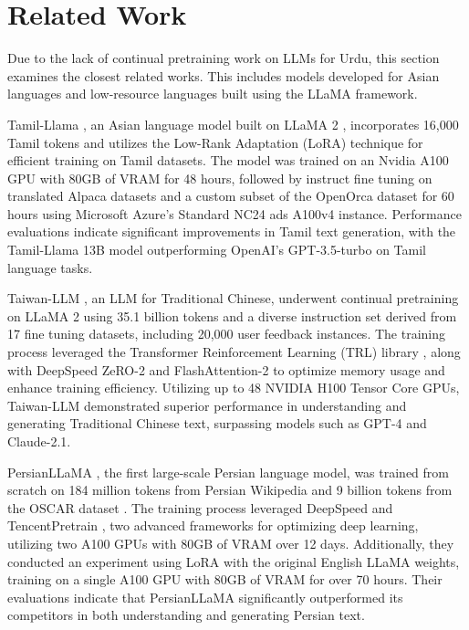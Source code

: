 \section{Related Work}
\label{sec:literature}
Due to the lack of continual pretraining work on LLMs for Urdu, this section examines the closest related works. This includes models developed for Asian languages and low-resource languages built using the LLaMA framework.

Tamil-Llama \citep{tamilllama}, an Asian language model built on LLaMA 2 \citep{llama2}, incorporates 16,000 Tamil tokens and utilizes the Low-Rank Adaptation (LoRA) \citep{lora} technique for efficient training on Tamil datasets. The model was trained on an Nvidia A100 GPU with 80GB of VRAM for 48 hours, followed by instruct fine tuning on translated Alpaca datasets \citep{alpaca} and a custom subset of the OpenOrca \citep{openorca} dataset for 60 hours using Microsoft Azure’s Standard NC24 ads A100v4 instance. Performance evaluations indicate significant improvements in Tamil text generation, with the Tamil-Llama 13B model outperforming OpenAI's GPT-3.5-turbo on Tamil language tasks.

Taiwan-LLM \citep{18}, an LLM for Traditional Chinese, underwent continual pretraining on LLaMA 2 \citep{llama2} using 35.1 billion tokens and a diverse instruction set derived from 17 fine tuning datasets, including 20,000 user feedback instances. The training process leveraged the Transformer Reinforcement Learning (TRL) library \citep{15}, along with DeepSpeed ZeRO-2 \citep{16} and FlashAttention-2 \citep{17} to optimize memory usage and enhance training efficiency. Utilizing up to 48 NVIDIA H100 Tensor Core GPUs, Taiwan-LLM demonstrated superior performance in understanding and generating Traditional Chinese text, surpassing models such as GPT-4 and Claude-2.1.

PersianLLaMA \citep{persianllama}, the first large-scale Persian language model, was trained from scratch on 184 million tokens from Persian Wikipedia and 9 billion tokens from the OSCAR dataset \citep{19}. The training process leveraged DeepSpeed \citep{deepspeed} and TencentPretrain \citep{20}, two advanced frameworks for optimizing deep learning, utilizing two A100 GPUs with 80GB of VRAM over 12 days. Additionally, they conducted an experiment using LoRA \citep{lora} with the original English LLaMA weights, training on a single A100 GPU with 80GB of VRAM for over 70 hours. Their evaluations indicate that PersianLLaMA significantly outperformed its competitors in both understanding and generating Persian text. 

